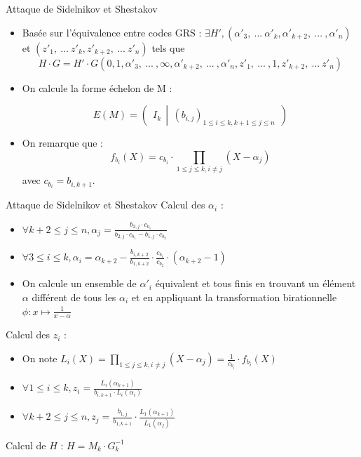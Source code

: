 \documentclass[]{beamer}
\begin{document}
\begin{frame}{Attaque de Sidelnikov et Shestakov}
\begin{itemize}
 \item Basée sur l'équivalence entre codes GRS : $\exists H',(\alpha'_3, \ ... \ \alpha'_{k}, \alpha'_{k+2},\ ... \ , \alpha'_n)$ et $(z'_1, \ ... \ z'_{k},z'_{k+2}, \ ... \ z'_n)$ tels que
 $$H\cdot G=H'\cdot G(0,1,\alpha'_3, \ ... \ ,\infty ,\alpha'_{k+2},\ ... \ , \alpha'_n,z'_1, \ ... \ ,1,z'_{k+2}, \ ... \ z'_n)$$
 \item On calcule la forme échelon de M :

$$ E(M) = 
\left( \ \ I_k \ \ \left| \ \ \left( b_{i,j}\right)_{1\leq i\leq k, k+1 \leq j \leq n} \ \
\right. \right)
$$
 \item On remarque que :
 $$f_{b_i}(X) = c_{b_i}\cdot \prod_{1\leq j\leq k, i\neq j} (X-\alpha_j)$$ avec $c_{b_i}=b_{i,k+1}$.
\end{itemize}

\end{frame}

\begin{frame}{Attaque de Sidelnikov et Shestakov}
Calcul des $\alpha_i$ :
\begin{itemize}
 \item $\forall k+2\leq j\leq n, \alpha_j = \frac{b_{2,j}\cdot c_{b_1}}{b_{2,j}\cdot c_{b_1} - b_{1,j}\cdot c_{b_2}}$
 \item $\forall 3\leq i\leq k, \alpha_i = \alpha_{k+2} - \frac{b_{i,k+2}}{b_{1,k+2}}\cdot \frac{c_{b_1}}{c_{b_2}}\cdot (\alpha_{k+2}-1)$
 \item On calcule un ensemble de $\alpha'_i$ équivalent et tous finis en trouvant un élément $\alpha$ différent de tous les $\alpha_i$ et en appliquant la transformation birationnelle $ \phi : x \mapsto \frac{1}{x - \alpha}$
\end{itemize}
Calcul des $z_i$ :
\begin{itemize}
 \item On note $L_i(X) = \prod_{1\leq j\leq k, i\neq j} (X-\alpha_j) = \frac{1}{c_{b_i}}\cdot f_{b_i}(X)$
 \item $\forall 1\leq i\leq k, z_i = \frac{L_i(\alpha_{k+1})}{b_{i,k+1}\cdot L_i(\alpha_i)}$
 \item $\forall k+2\leq j\leq n, z_j = \frac{b_{1,j}}{b_{1,k+1}} \cdot \frac{L_1(\alpha_{k+1})}{L_1(\alpha_j)}$
\end{itemize}
Calcul de $H$ : $H = M_{k}\cdot G_{k}^{-1}$
\end{frame}
\end{document}
